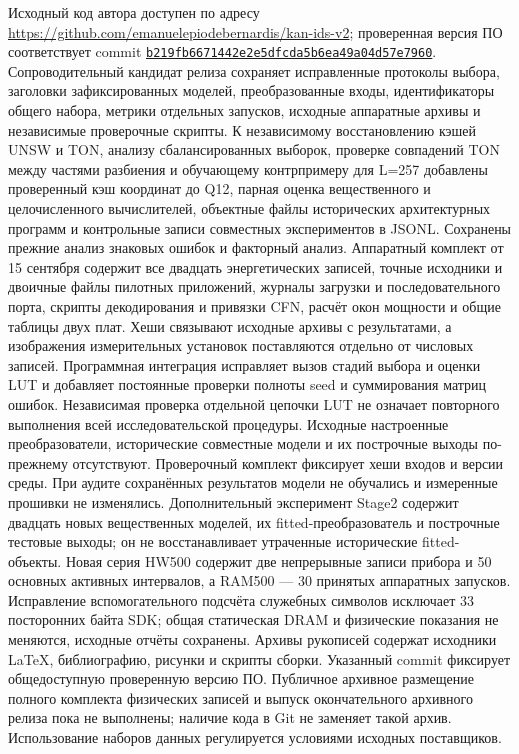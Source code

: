 Исходный код автора доступен по адресу \url{https://github.com/emanuelepiodebernardis/kan-ids-v2}; проверенная версия ПО соответствует commit \href{https://github.com/emanuelepiodebernardis/kan-ids-v2/tree/b219fb6671442e2e5dfcda5b6ea49a04d57e7960}{\texttt{b219fb6671442e2e5dfcda5b6ea49a04d57e7960}}. Сопроводительный кандидат релиза сохраняет исправленные протоколы выбора, заголовки зафиксированных моделей, преобразованные входы, идентификаторы общего набора, метрики отдельных запусков, исходные аппаратные архивы и независимые проверочные скрипты. К независимому восстановлению кэшей UNSW и TON, анализу сбалансированных выборок, проверке совпадений TON между частями разбиения и обучающему контрпримеру для L=257 добавлены проверенный кэш координат до Q12, парная оценка вещественного и целочисленного вычислителей, объектные файлы исторических архитектурных программ и контрольные записи совместных экспериментов в JSONL. Сохранены прежние анализ знаковых ошибок и факторный анализ. Аппаратный комплект от 15 сентября содержит все двадцать энергетических записей, точные исходники и двоичные файлы пилотных приложений, журналы загрузки и последовательного порта, скрипты декодирования и привязки CFN, расчёт окон мощности и общие таблицы двух плат. Хеши связывают исходные архивы с результатами, а изображения измерительных установок поставляются отдельно от числовых записей. Программная интеграция исправляет вызов стадий выбора и оценки LUT и добавляет постоянные проверки полноты seed и суммирования матриц ошибок. Независимая проверка отдельной цепочки LUT не означает повторного выполнения всей исследовательской процедуры. Исходные настроенные преобразователи, исторические совместные модели и их построчные выходы по-прежнему отсутствуют. Проверочный комплект фиксирует хеши входов и версии среды. При аудите сохранённых результатов модели не обучались и измеренные прошивки не изменялись. Дополнительный эксперимент Stage2 содержит двадцать новых вещественных моделей, их fitted-преобразователь и построчные тестовые выходы; он не восстанавливает утраченные исторические fitted-объекты. Новая серия HW500 содержит две непрерывные записи прибора и 50 основных активных интервалов, а RAM500 --- 30 принятых аппаратных запусков. Исправление вспомогательного подсчёта служебных символов исключает 33 посторонних байта SDK; общая статическая DRAM и физические показания не меняются, исходные отчёты сохранены. Архивы рукописей содержат исходники LaTeX, библиографию, рисунки и скрипты сборки. Указанный commit фиксирует общедоступную проверенную версию ПО. Публичное архивное размещение полного комплекта физических записей и выпуск окончательного архивного релиза пока не выполнены; наличие кода в Git не заменяет такой архив. Использование наборов данных регулируется условиями исходных поставщиков.

